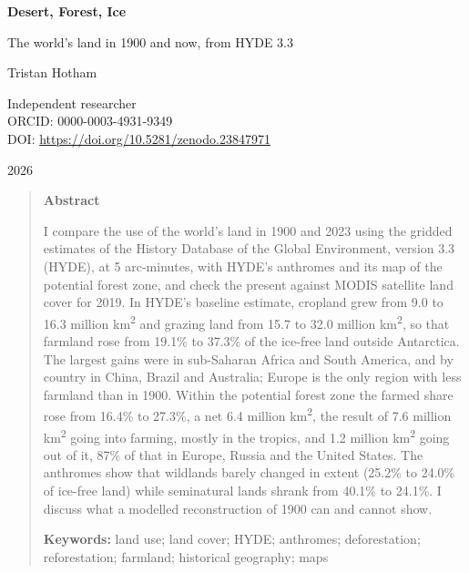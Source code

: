 \documentclass[11pt,a4paper]{article}
\begin{document}
\begin{center}
{\Large\bfseries Desert, Forest, Ice\par}
\vspace{0.4em}
{\large The world's land in 1900 and now, from HYDE 3.3\par}
\vspace{1.2em}
{\large Tristan Hotham\par}
\vspace{0.3em}
{\small Independent researcher\\
ORCID: 0000-0003-4931-9349\\
DOI: \href{https://doi.org/10.5281/zenodo.23847971}{https://doi.org/10.5281/zenodo.23847971}\par}
\vspace{0.8em}
2026
\end{center}

\begin{quote}
\small
\begin{center}\textbf{Abstract}\end{center}
I compare the use of the world's land in 1900 and 2023 using the gridded estimates of the History Database of the Global Environment, version 3.3 (HYDE), at 5 arc-minutes, with HYDE's anthromes and its map of the potential forest zone, and check the present against MODIS satellite land cover for 2019. In HYDE's baseline estimate, cropland grew from 9.0 to 16.3 million km\textsuperscript{2} and grazing land from 15.7 to 32.0 million km\textsuperscript{2}, so that farmland rose from 19.1\% to 37.3\% of the ice-free land outside Antarctica. The largest gains were in sub-Saharan Africa and South America, and by country in China, Brazil and Australia; Europe is the only region with less farmland than in 1900. Within the potential forest zone the farmed share rose from 16.4\% to 27.3\%, a net 6.4 million km\textsuperscript{2}, the result of 7.6 million km\textsuperscript{2} going into farming, mostly in the tropics, and 1.2 million km\textsuperscript{2} going out of it, 87\% of that in Europe, Russia and the United States. The anthromes show that wildlands barely changed in extent (25.2\% to 24.0\% of ice-free land) while seminatural lands shrank from 40.1\% to 24.1\%. I discuss what a modelled reconstruction of 1900 can and cannot show.

\textbf{Keywords:} land use; land cover; HYDE; anthromes; deforestation; reforestation; farmland; historical geography; maps
\end{quote}
\end{document}
